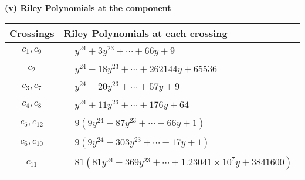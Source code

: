 \documentclass[1p]{elsarticle_modified}
\theoremstyle{definition}
\begin{document}
\flushleft \textbf{(v) Riley Polynomials at the component}\newline \\
\begin{tabular}{m{50pt}|m{274pt}}
Crossings & \hspace{64pt}Riley Polynomials at each crossing \\
\hline $$\begin{aligned}c_{1},c_{9}\end{aligned}$$&$\begin{aligned}
&y^{24}+3 y^{23}+\cdots+66 y+9
\end{aligned}$\\
\hline $$\begin{aligned}c_{2}\end{aligned}$$&$\begin{aligned}
&y^{24}-18 y^{23}+\cdots+262144 y+65536
\end{aligned}$\\
\hline $$\begin{aligned}c_{3},c_{7}\end{aligned}$$&$\begin{aligned}
&y^{24}-20 y^{23}+\cdots+57 y+9
\end{aligned}$\\
\hline $$\begin{aligned}c_{4},c_{8}\end{aligned}$$&$\begin{aligned}
&y^{24}+11 y^{23}+\cdots+176 y+64
\end{aligned}$\\
\hline $$\begin{aligned}c_{5},c_{12}\end{aligned}$$&$\begin{aligned}
&9(9 y^{24}-87 y^{23}+\cdots-66 y+1)
\end{aligned}$\\
\hline $$\begin{aligned}c_{6},c_{10}\end{aligned}$$&$\begin{aligned}
&9(9 y^{24}-303 y^{23}+\cdots-17 y+1)
\end{aligned}$\\
\hline $$\begin{aligned}c_{11}\end{aligned}$$&$\begin{aligned}
&81(81 y^{24}-369 y^{23}+\cdots+1.23041\times10^{7} y+3841600)
\end{aligned}$\\
\hline
\end{tabular}\\~\\
\end{document}
